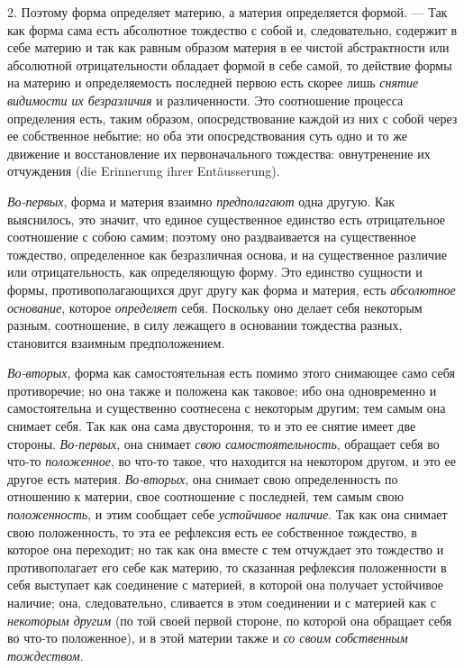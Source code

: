 2. Поэтому форма определяет материю, а материя определяется формой. — Так
как форма сама есть абсолютное тождество с собой и, следовательно, содержит
в себе материю и так как равным образом материя в ее чистой абстрактности
или абсолютной отрицательности обладает формой в себе самой, то действие
формы на материю и определяемость последней первою есть скорее лишь
{\em снятие видимости их безразличия} и различенности.
Это соотношение процесса определения есть, таким образом, опосредствование
каждой из них с собой через ее собственное небытие; но оба эти
опосредствования суть одно и то же движение и восстановление их
первоначального тождества: овнутренение их отчуждения (die Erinnerung ihrer
Entäusserung).

{\em Во-первых}, форма и материя взаимно
{\em предполагают} одна другую. Как выяснилось, это
значит, что единое существенное единство есть отрицательное соотношение с
собою самим; поэтому оно раздваивается на существенное тождество,
определенное как безразличная основа, и на существенное различие или
отрицательность, как определяющую форму. Это единство сущности и формы,
противополагающихся друг другу как форма и материя, есть
{\em абсолютное основание}, которое
{\em определяет} себя. Поскольку оно делает себя
некоторым разным, соотношение, в силу лежащего в основании тождества
разных, становится взаимным предположением.

{\em Во-вторых}, форма как самостоятельная есть помимо
этого снимающее само себя противоречие; но она также и положена как
таковое; ибо она одновременно и самостоятельна и существенно соотнесена с
некоторым другим; тем самым она снимает себя. Так как она сама двустороння,
то и это ее снятие имеет две стороны. {\em Во-первых},
она снимает {\em свою самостоятельность}, обращает себя
во что-то {\em положенное}, во что-то такое, что
находится на некотором другом, и это ее другое есть материя.
{\em Во-вторых}, она снимает свою определенность по
отношению к материи, свое соотношение с последней, тем самым свою
{\em положенность}, и этим сообщает себе
{\em устойчивое наличие}. Так как она снимает свою
положенность, то эта ее рефлексия есть ее собственное тождество, в которое
она переходит; но так как она вместе с тем отчуждает это тождество и
противополагает его себе как материю, то сказанная рефлексия положенности в
себя выступает как соединение с материей, в которой она получает устойчивое
наличие; она, следовательно, сливается в этом соединении и с материей как с
{\em некоторым другим} (по той своей первой стороне, по
которой она обращает себя во что-то положенное), и в этой материи также и
{\em со своим собственным тождеством}.

